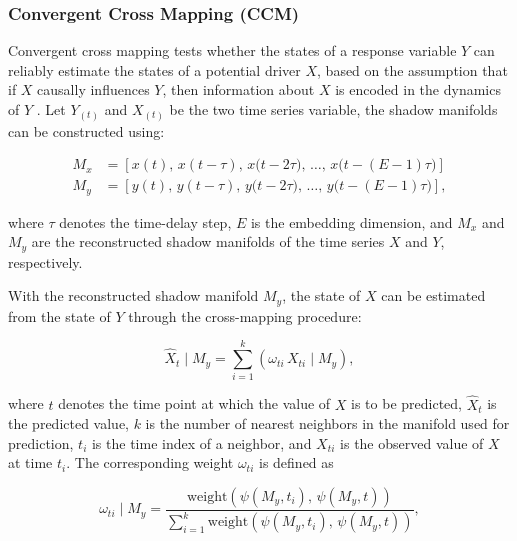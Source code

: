 \documentclass[authoryear,preprint,review,12pt]{elsarticle}
\begin{document}
\subsubsection{Convergent Cross Mapping (CCM)}\label{sec_ccm}

Convergent cross mapping tests whether the states of a response variable $Y$ can reliably estimate the states of a potential driver $X$, based on the assumption that if $X$ causally influences $Y$, then information about $X$ is encoded in the dynamics of $Y$ \citep{sugihara2012ccm}. Let $Y_{(t)}$ and $X_{(t)}$ be the two time series variable, the shadow manifolds can be constructed using:

\begin{equation}\label{eq_ts_embedding}
\begin{split}
M_{x} &= \left[ x(t),\, x(t-\tau),\, x\big(t-2\tau\big),\, \ldots,\, x\big(t-(E - 1)\tau\big) \right] \\
M_{y} &= \left[ y(t),\, y(t-\tau),\, y\big(t-2\tau\big),\, \ldots,\, y\big(t-(E - 1)\tau\big) \right],
\end{split}
\end{equation}

\noindent where $\tau$ denotes the time-delay step, $E$ is the embedding dimension, and $M_{x}$ and $M_{y}$ are the reconstructed shadow manifolds of the time series $X$ and $Y$, respectively.

With the reconstructed shadow manifold $M_{y}$, the state of $X$ can be estimated from the state of $Y$ through the cross-mapping procedure:

\begin{equation}\label{eq_cross_mapping}
\hat{X}_t \mid M_y = \sum_{i=1}^k \left( \omega_{ti} \, X_{ti} \mid M_y \right),
\end{equation}

\noindent where $t$ denotes the time point at which the value of $X$ is to be predicted, $\hat{X}_t$ is the predicted value, $k$ is the number of nearest neighbors in the manifold used for prediction, $t_i$ is the time index of a neighbor, and $X_{ti}$ is the observed value of $X$ at time $t_i$. The corresponding weight $\omega_{ti}$ is defined as

\begin{equation}\label{eq_ccm_weight}
\omega_{ti} \mid M_y = \frac{ \mathrm{weight} \left( \psi(M_y, t_i),\, \psi(M_y, t) \right) }{ \sum_{i=1}^{k} \mathrm{weight} \left( \psi(M_y, t_i),\, \psi(M_y, t) \right) },
\end{equation}
\end{document}
